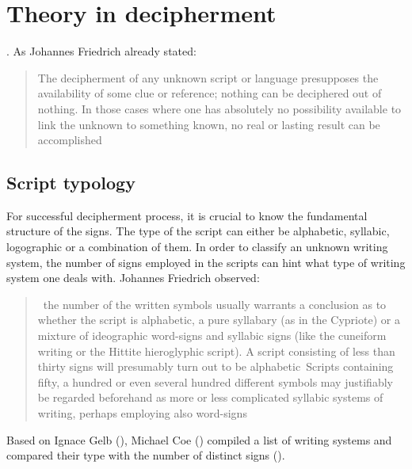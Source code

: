 \documentclass[../main.tex]{subfiles}
\begin{document}
\section{Theory in decipherment}
.
As Johannes Friedrich already stated:
\blockquote[{\cite[152]{friedrich1957}}]{The decipherment of any unknown script or language 
presupposes the availability of some clue or reference; nothing can be deciphered out of nothing. 
In those cases where one has absolutely no possibility available to link the unknown to 
something known, \elide no real or lasting result can be accomplished}


\subsection{Script typology}
For successful decipherment process, it is crucial to know the fundamental structure of the signs.
The type of the script can either be alphabetic, syllabic, logographic or a combination of them.
In order to classify an unknown writing system, the number of signs employed in the scripts
can hint what type of writing system one deals with.
Johannes Friedrich observed:
\blockquote[{\cite[152]{friedrich1957}}]{\elide~the number of the written symbols usually warrants a 
conclusion as to whether the script is alphabetic, a pure syllabary (as in the Cypriote) or a
mixture of ideographic word-signs and syllabic signs (like the cuneiform writing or the Hittite
hieroglyphic script). A script consisting of less than thirty signs will presumably turn out to
be alphabetic\elide~Scripts containing fifty, a hundred or even several hundred different symbols
may justifiably be regarded beforehand as more or less complicated syllabic systems of writing,
perhaps employing also word-signs\elide}.
Based on Ignace Gelb (\cite[115]{gelb1963}), Michael Coe (\cite[43]{coe1992}) compiled a list
of writing systems and compared their type with the number of distinct signs
().
\end{document}
